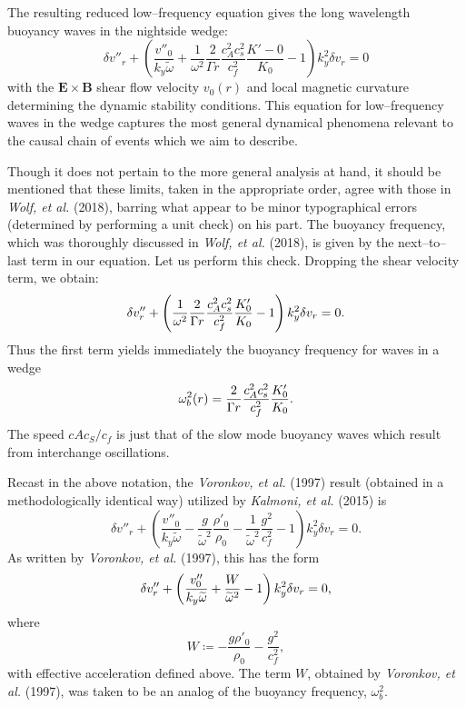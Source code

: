 \documentclass[a4paper,openany,12pt]{book}
\begin{document}
The resulting reduced low--frequency equation gives the long wavelength buoyancy waves in the nightside wedge:
\begin{equation}
\delta v''_r+\left(\frac{v''_0}{k_y\widetilde\omega}+\frac{1}{\omega^2}\frac{2}{\Gamma r}\frac{c_A^2c_s^2}{c_f^2}\frac{K'-0}{K_0}-1\right)k_y^2\delta v_r=0\label{E9.109}
\end{equation}
with the $\bm{E\times B}$ shear flow velocity $v_0(r)$ and local magnetic curvature determining the dynamic stability conditions. This equation for low--frequency waves in the wedge captures the most general dynamical phenomena relevant to the causal chain of events which we aim to describe.

Though it does not pertain to the more general analysis at hand, it should be mentioned that these limits, taken in the appropriate order, agree with those in \emph{Wolf, et al.} (2018), barring what appear to be minor typographical errors (determined by performing a unit check) on his part. The buoyancy frequency, which was thoroughly discussed in \emph{Wolf, et al.} (2018), is given by the next--to--last term in our equation. Let us perform this check. Dropping the shear velocity term, we obtain:
\begin{equation}
\delta v''_r+\left({1\over \omega^2}{2\over \Gamma r}{c_A^2c_s^2\over c_f^2}{K'_0\over K_0}-1\right)k_y^2\delta v_r=0.\label{E9.110}
\end{equation}
Thus the first term yields immediately the buoyancy frequency for waves in a wedge
\begin{equation}
\omega_b^2(r)={2\over \Gamma r}{c_A^2c_s^2\over c_f^2}{K'_0\over K_0}.\label{E9.111}
\end{equation}
The speed $cAc_S/c_f$ is just that of the slow mode buoyancy waves which result from interchange oscillations.

Recast in the above notation, the \emph{Voronkov, et al.} (1997) result (obtained in a methodologically identical way) utilized by \emph{Kalmoni, et al.} (2015) is
\begin{equation}
\delta v''_r+\left(\frac{v''_0}{k_y\widetilde\omega}-\frac{g}{\widetilde\omega^2}\frac{\rho'_0}{\rho_0}-\frac{1}{\widetilde\omega^2}\frac{g^2}{c_f^2}-1\right)k_y^2\delta v_r=0.\label{E9.112}
\end{equation}
As written by \emph{Voronkov, et al.} (1997), this has the form
\begin{equation}
\delta v''_r+\left({v''_0\over k_y\widetilde\omega}+{W\over\widetilde\omega^2}
-1\right)k_y^2\delta v_r=0,\label{E9.113}
\end{equation}
where
\begin{equation}
W\coloneqq-\frac{g\rho'_0}{\rho_0}-\frac{g^2}{c_f^2},\label{E9.114}
\end{equation}
with effective acceleration defined above. The term $W$, obtained by \emph{Voronkov, et al.} (1997), was taken to be an analog of the buoyancy frequency, 
$\omega_b^2$.
\end{document}
